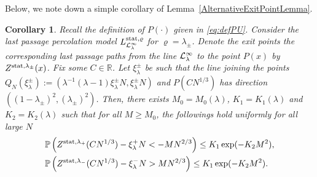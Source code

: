 \documentclass[12pt,a4paper]{article}
\numberwithin{equation}{section}
\newcommand{\Pb}{\mathbb{P}}
\newcommand{\R}{\mathbb{R}}
\newtheorem{cor}[prop]{Corollary}
\begin{document}
Below, we note down a simple corollary of Lemma~\ref{AlternativeExitPointLemma}.
\begin{cor}\label{ExitPCor}
Recall the definition of $P(\cdot)$ given in \eqref{eq:defPU}. Consider the last passage percolation model $L^{{\rm stat}, \varrho}_{{\cal L}^{\infty}_{\lambda}}$ for $\varrho=\lambda_{\pm}$. Denote the exit points the corresponding last passage paths from the line ${\cal L}^{\infty}_{\lambda}$ to the point $P(x)$ by $Z^{{\rm stat}, \lambda_\pm}(x)$. Fix some \mbox{$C \in \R$}. Let $\xi^{\pm}_{\lambda}$ be such that the line joining the points \mbox{$Q_N(\xi^{\pm}_{\lambda}):=(\lambda^{-1}(\lambda-1)\xi^{\pm}_{\lambda} N, \xi^{\pm}_{\lambda} N)$} and $P(CN^{1/3})$ has direction $((1-\lambda_{\pm})^2, (\lambda_{\pm})^2)$. Then, there exists $M_0=M_0(\lambda)$, $K_1=K_1(\lambda)$ and $K_2=K_2(\lambda)$ such that for all $M\geq M_0$, the followings hold uniformly for all large $N$
 \begin{align}
 &\Pb\left(Z^{{\rm stat},\lambda_{+}}(CN^{1/3}) - \xi^{+}_{\lambda} N< -M N^{2/3}\right)\leq K_1\exp(-K_2 M^2),\label{eq:ExitLowerTail}\\
 &\Pb\left(Z^{{\rm stat},\lambda_{-}}(CN^{1/3}) - \xi^{-}_{\lambda} N> M N^{2/3}\right)\leq K_1\exp(-K_2 M^2).\label{eq:ExitUpperTail}
 \end{align}
\end{cor}
\end{document}
